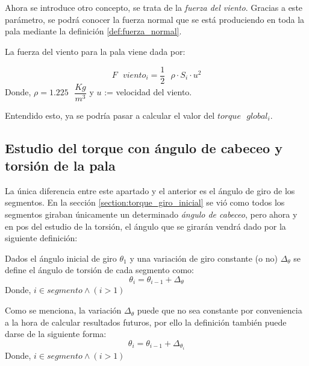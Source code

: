  \\\\Ahora se introduce otro concepto, se trata de la \textit{fuerza del viento}. Gracias a este parámetro, se podrá conocer la fuerza normal que se está produciendo en toda la pala mediante la definición \ref{def:fuerza_normal}.
 
 
 \begin{definicion}
 La fuerza del viento para la pala viene dada por:
 
 $$ F \text{ } viento_i = \dfrac{1}{2} \text{ } \rho \cdot S_i \cdot u^2$$
Donde,
 \centering  $\rho = 1.225 \text{ } \dfrac{Kg}{m^3}$ y $u$ := velocidad del viento.
 \label{def:fuerza_viento_inicial}
 \end{definicion}
 
\vspace{15pt} Entendido esto, ya se podría pasar a calcular el valor del $torque \text{ } global_i$.
 
 
 
 
 
 
 
 
 
 
 
 
 \subsection{Estudio del torque con ángulo de cabeceo y torsión de la pala}
\label{section:torque_giro_torsion}

La única diferencia entre este apartado y el anterior es el ángulo de giro de los segmentos. En la sección \ref{section:torque_giro_inicial} se vió como todos los segmentos giraban únicamente un determinado \textit{ángulo de cabeceo}, pero ahora y en pos del estudio de la torsión, el ángulo que se girarán vendrá dado por la siguiente definición: 


\begin{definicion}
Dados el ángulo inicial de giro $\theta_1 $ y una variación de giro constante (o no) $\Delta_\theta$ se define el ángulo de torsión de cada segmento como:
$$\theta_i = \theta_{i-1} + \Delta_\theta$$ 
Donde,
\centering $i \in segmento \wedge (i > 1)$

\label{def:theta_cte}
\end{definicion}


\begin{definicion}
Como se menciona, la variación $\Delta_\theta$ puede que no sea constante por conveniencia a la hora de calcular resultados futuros, por ello la definición también puede darse de la siguiente forma:
$$\theta_i = \theta_{i-1} + \Delta_{\theta_{i}}$$ 
Donde,
\centering $i \in segmento \wedge (i > 1)$
\label{def:theta_nocte}
\end{definicion}


